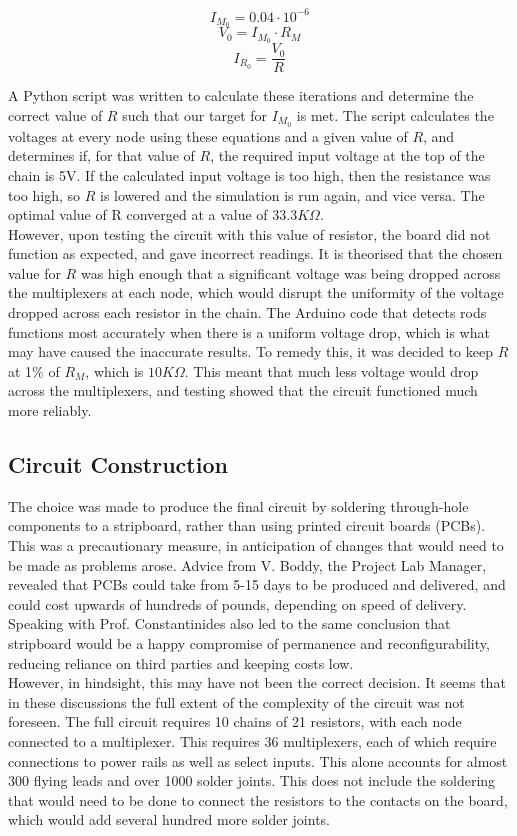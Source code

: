 $$ I_{M_0} = 0.04 \cdot 10^{-6}$$
$$ V_0 =  I_{M_0} \cdot R_M $$
$$ I_{R_0} = \frac{V_0}{R}$$

A Python script was written to calculate these iterations and determine the correct value of $R$ such that our target for  $I_{M_0}$ is met. The script calculates the voltages at every node using these equations and a given value of $R$, and determines if, for that value of $R$, the required input voltage at the top of the chain is 5V. If the calculated input voltage is too high, then the resistance was too high, so $R$ is lowered and the simulation is run again, and vice versa. The optimal value of R converged at a value of $33.3K\Omega$. \\

However, upon testing the circuit with this value of resistor, the board did not function as expected, and gave incorrect readings. It is theorised that the chosen value for $R$ was high enough that a significant voltage was being dropped across the multiplexers at each node, which would disrupt the uniformity of the voltage dropped across each resistor in the chain. The Arduino code that detects rods functions most accurately when there is a uniform voltage drop, which is what may have caused the inaccurate results. To remedy this, it was decided to keep $R$ at 1\% of $R_M$, which is $10K\Omega$. This meant that much less voltage would drop across the multiplexers, and testing showed that the circuit functioned much more reliably.\\

\subsection{Circuit Construction}

The choice was made to produce the final circuit by soldering through-hole components to a stripboard, rather than using printed circuit boards (PCBs). This was a precautionary measure, in anticipation of changes that would need to be made as problems arose. Advice from V. Boddy, the Project Lab Manager, revealed that PCBs could take from 5-15 days to be produced and delivered, and could cost upwards of hundreds of pounds, depending on speed of delivery. Speaking with Prof. Constantinides also led to the same conclusion that stripboard would be a happy compromise of permanence and reconfigurability, reducing reliance on third parties and keeping costs low.\\

However, in hindsight, this may have not been the correct decision. It seems that in these discussions the full extent of the complexity of the circuit was not foreseen. The full circuit requires 10 chains of 21 resistors, with each node connected to a multiplexer. This requires 36 multiplexers, each of which require connections to power rails as well as select inputs. This alone accounts for almost 300 flying leads and over 1000 solder joints. This does not include the soldering that would need to be done to connect the resistors to the contacts on the board, which would add several hundred more solder joints. \\

